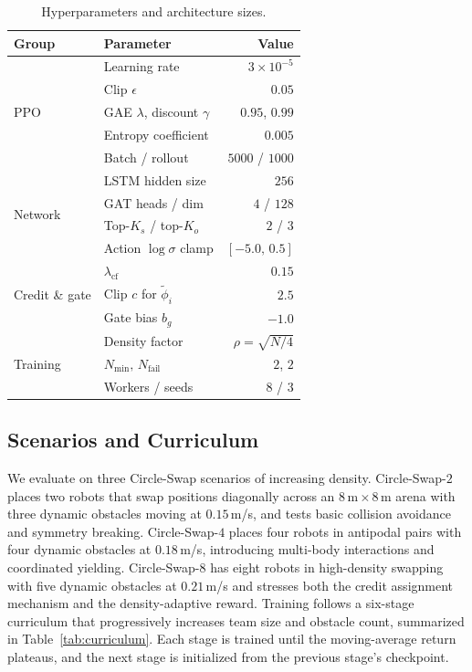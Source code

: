 \documentclass[journal,twoside,web]{ieeecolor}
\begin{document}
\begin{table}[t]
\centering
\caption{Hyperparameters and architecture sizes.}
\label{tab:hyperparams}
\renewcommand{\arraystretch}{1.05}
\setlength{\tabcolsep}{6pt}
\begin{tabularx}{\columnwidth}{l X r}
\toprule
Group & Parameter & Value \\
\midrule
\multirow{5}{*}{PPO}
 & Learning rate                    & $3\times10^{-5}$ \\
 & Clip $\epsilon$                  & $0.05$ \\
 & GAE $\lambda$, discount $\gamma$ & $0.95$, $0.99$ \\
 & Entropy coefficient              & $0.005$ \\
 & Batch / rollout                  & $5000$ / $1000$ \\
\midrule
\multirow{4}{*}{Network}
 & LSTM hidden size                 & $256$ \\
 & GAT heads / dim                  & $4$ / $128$ \\
 & Top-$K_s$ / top-$K_o$            & $2$ / $3$ \\
 & Action $\log\sigma$ clamp        & $[-5.0,\,0.5]$ \\
\midrule
\multirow{3}{*}{Credit \& gate}
 & $\lambda_{\text{cf}}$            & $0.15$ \\
 & Clip $c$ for $\widetilde\phi_i$  & $2.5$ \\
 & Gate bias $b_g$                  & $-1.0$ \\
\midrule
\multirow{3}{*}{Training}
 & Density factor                   & $\rho=\sqrt{N/4}$ \\
 & $N_{\min},\,N_{\text{fail}}$     & $2$, $2$ \\
 & Workers / seeds                  & $8$ / $3$ \\
\bottomrule
\end{tabularx}
\end{table}

\subsection{Scenarios and Curriculum}
\label{sec:setup_scenarios}

We evaluate on three Circle-Swap scenarios of increasing density. Circle-Swap-$2$ places two robots that swap positions diagonally across an $8\,\text{m}\times 8\,\text{m}$ arena with three dynamic obstacles moving at $0.15$\,m/s, and tests basic collision avoidance and symmetry breaking. Circle-Swap-$4$ places four robots in antipodal pairs with four dynamic obstacles at $0.18$\,m/s, introducing multi-body interactions and coordinated yielding. Circle-Swap-$8$ has eight robots in high-density swapping with five dynamic obstacles at $0.21$\,m/s and stresses both the credit assignment mechanism and the density-adaptive reward. Training follows a six-stage curriculum that progressively increases team size and obstacle count, summarized in Table~\ref{tab:curriculum}. Each stage is trained until the moving-average return plateaus, and the next stage is initialized from the previous stage's checkpoint.
\end{document}
